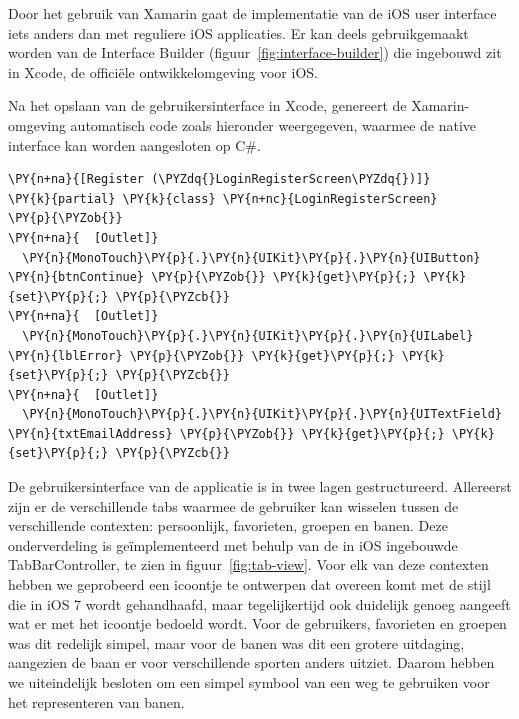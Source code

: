 Door het gebruik van Xamarin gaat de implementatie van de iOS user interface iets anders dan met reguliere iOS applicaties. Er kan deels gebruikgemaakt worden van de Interface Builder (figuur~\ref{fig:interface-builder}) die ingebouwd zit in Xcode, de officiële ontwikkelomgeving voor iOS.

Na het opslaan van de gebruikersinterface in Xcode, genereert de Xamarin-omgeving automatisch code zoals hieronder weergegeven, waarmee de native interface kan worden aangesloten op C\#.



\begin{Verbatim}[commandchars=\\\{\}]
\PY{n+na}{[Register (\PYZdq{}LoginRegisterScreen\PYZdq{})]}
\PY{k}{partial} \PY{k}{class} \PY{n+nc}{LoginRegisterScreen}
\PY{p}{\PYZob{}}
\PY{n+na}{  [Outlet]}
  \PY{n}{MonoTouch}\PY{p}{.}\PY{n}{UIKit}\PY{p}{.}\PY{n}{UIButton} \PY{n}{btnContinue} \PY{p}{\PYZob{}} \PY{k}{get}\PY{p}{;} \PY{k}{set}\PY{p}{;} \PY{p}{\PYZcb{}}
\PY{n+na}{  [Outlet]}
  \PY{n}{MonoTouch}\PY{p}{.}\PY{n}{UIKit}\PY{p}{.}\PY{n}{UILabel} \PY{n}{lblError} \PY{p}{\PYZob{}} \PY{k}{get}\PY{p}{;} \PY{k}{set}\PY{p}{;} \PY{p}{\PYZcb{}}
\PY{n+na}{  [Outlet]}
  \PY{n}{MonoTouch}\PY{p}{.}\PY{n}{UIKit}\PY{p}{.}\PY{n}{UITextField} \PY{n}{txtEmailAddress} \PY{p}{\PYZob{}} \PY{k}{get}\PY{p}{;} \PY{k}{set}\PY{p}{;} \PY{p}{\PYZcb{}}
\end{Verbatim}

De gebruikersinterface van de applicatie is in twee lagen gestructureerd. Allereerst zijn er de verschillende tabs waarmee de gebruiker kan wisselen tussen de verschillende contexten: persoonlijk, favorieten, groepen en banen. Deze onderverdeling is geïmplementeerd met behulp van de in iOS ingebouwde TabBarController, te zien in figuur~\ref{fig:tab-view}. Voor elk van deze contexten hebben we geprobeerd een icoontje te ontwerpen dat overeen komt met de stijl die in iOS 7 wordt gehandhaafd, maar tegelijkertijd ook duidelijk genoeg aangeeft wat er met het icoontje bedoeld wordt. Voor de gebruikers, favorieten en groepen was dit redelijk simpel, maar voor de banen was dit een grotere uitdaging, aangezien de baan er voor verschillende sporten anders uitziet. Daarom hebben we uiteindelijk besloten om een simpel symbool van een weg te gebruiken voor het representeren van banen.

